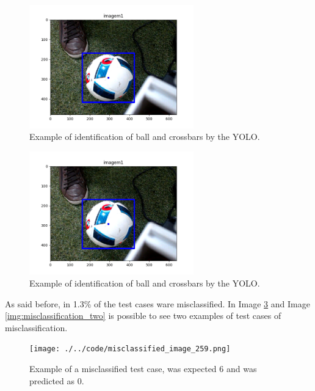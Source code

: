 \documentclass[journal]{IEEEtran}
\begin{document}
\begin{figure}
  \begin{center}
  \includegraphics[width=2.8in]{./../code/imagem1_detection.png}
  \caption{Example of identification of ball and crossbars by the YOLO.}
  \label{img:classification_one}
  \end{center}
\end{figure}

\begin{figure}
  \begin{center}
  \includegraphics[width=2.8in]{./../code/imagem1_detection.png}
  \caption{Example of identification of ball and crossbars by the YOLO.}
  \label{img:classification_one}
  \end{center}
\end{figure}




As said before, in 1.3\% of the test cases ware misclassified. In Image \ref{img:misclassification_one} and Image \ref{img:misclassification_two} is possible to see two examples of test cases of misclassification.

\begin{figure}
  \begin{center}
  \texttt{[image: ./../code/misclassified\_image\_259.png]}
  \caption{Example of a misclassified test case, was expected 6 and was predicted as 0.}
  \label{img:misclassification_one}
  \end{center}
\end{figure}
\end{document}
